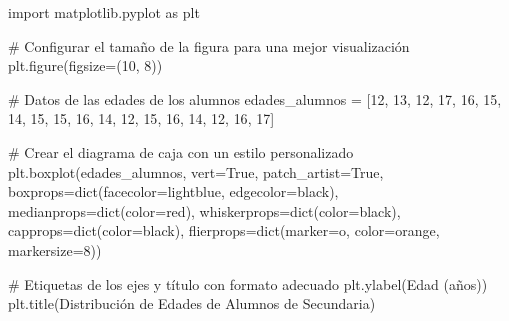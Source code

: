 \documentclass[
  jou,
  floatsintext,
  longtable,
  a4paper,
  nolmodern,
  notxfonts,
  notimes,
  colorlinks=true,linkcolor=blue,citecolor=blue,urlcolor=blue]{apa7}
\newenvironment{Shaded}{\begin{snugshade}}{\end{snugshade}}
\newcommand{\BuiltInTok}[1]{\textcolor[rgb]{0.00,0.23,0.31}{#1}}
\newcommand{\CommentTok}[1]{\textcolor[rgb]{0.37,0.37,0.37}{#1}}
\newcommand{\DecValTok}[1]{\textcolor[rgb]{0.68,0.00,0.00}{#1}}
\newcommand{\ImportTok}[1]{\textcolor[rgb]{0.00,0.46,0.62}{#1}}
\newcommand{\NormalTok}[1]{\textcolor[rgb]{0.00,0.23,0.31}{#1}}
\newcommand{\OperatorTok}[1]{\textcolor[rgb]{0.37,0.37,0.37}{#1}}
\newcommand{\StringTok}[1]{\textcolor[rgb]{0.13,0.47,0.30}{#1}}
\newcommand{\VariableTok}[1]{\textcolor[rgb]{0.07,0.07,0.07}{#1}}
\begin{document}
\begin{Shaded}
\begin{Highlighting}[]
\ImportTok{import}\NormalTok{ matplotlib.pyplot }\ImportTok{as}\NormalTok{ plt}

\CommentTok{\# Configurar el tamaño de la figura para una mejor visualización}
\NormalTok{plt.figure(figsize}\OperatorTok{=}\NormalTok{(}\DecValTok{10}\NormalTok{, }\DecValTok{8}\NormalTok{))}

\CommentTok{\# Datos de las edades de los alumnos}
\NormalTok{edades\_alumnos }\OperatorTok{=}\NormalTok{ [}\DecValTok{12}\NormalTok{, }\DecValTok{13}\NormalTok{, }\DecValTok{12}\NormalTok{, }\DecValTok{17}\NormalTok{, }\DecValTok{16}\NormalTok{, }\DecValTok{15}\NormalTok{, }\DecValTok{14}\NormalTok{, }\DecValTok{15}\NormalTok{, }\DecValTok{15}\NormalTok{, }\DecValTok{16}\NormalTok{, }\DecValTok{14}\NormalTok{, }\DecValTok{12}\NormalTok{, }\DecValTok{15}\NormalTok{, }\DecValTok{16}\NormalTok{, }\DecValTok{14}\NormalTok{, }\DecValTok{12}\NormalTok{, }\DecValTok{16}\NormalTok{, }\DecValTok{17}\NormalTok{]}

\CommentTok{\# Crear el diagrama de caja con un estilo personalizado}
\NormalTok{plt.boxplot(edades\_alumnos, vert}\OperatorTok{=}\VariableTok{True}\NormalTok{, patch\_artist}\OperatorTok{=}\VariableTok{True}\NormalTok{, }
\NormalTok{            boxprops}\OperatorTok{=}\BuiltInTok{dict}\NormalTok{(facecolor}\OperatorTok{=}\StringTok{\textquotesingle{}lightblue\textquotesingle{}}\NormalTok{, edgecolor}\OperatorTok{=}\StringTok{\textquotesingle{}black\textquotesingle{}}\NormalTok{),}
\NormalTok{            medianprops}\OperatorTok{=}\BuiltInTok{dict}\NormalTok{(color}\OperatorTok{=}\StringTok{\textquotesingle{}red\textquotesingle{}}\NormalTok{), whiskerprops}\OperatorTok{=}\BuiltInTok{dict}\NormalTok{(color}\OperatorTok{=}\StringTok{\textquotesingle{}black\textquotesingle{}}\NormalTok{),}
\NormalTok{            capprops}\OperatorTok{=}\BuiltInTok{dict}\NormalTok{(color}\OperatorTok{=}\StringTok{\textquotesingle{}black\textquotesingle{}}\NormalTok{), flierprops}\OperatorTok{=}\BuiltInTok{dict}\NormalTok{(marker}\OperatorTok{=}\StringTok{\textquotesingle{}o\textquotesingle{}}\NormalTok{, color}\OperatorTok{=}\StringTok{\textquotesingle{}orange\textquotesingle{}}\NormalTok{, markersize}\OperatorTok{=}\DecValTok{8}\NormalTok{))}

\CommentTok{\# Etiquetas de los ejes y título con formato adecuado}
\NormalTok{plt.ylabel(}\StringTok{\textquotesingle{}Edad (años)\textquotesingle{}}\NormalTok{)}
\NormalTok{plt.title(}\StringTok{\textquotesingle{}Distribución de Edades de Alumnos de Secundaria\textquotesingle{}}\NormalTok{)}


\end{Highlighting}
\end{Shaded}
\end{document}
